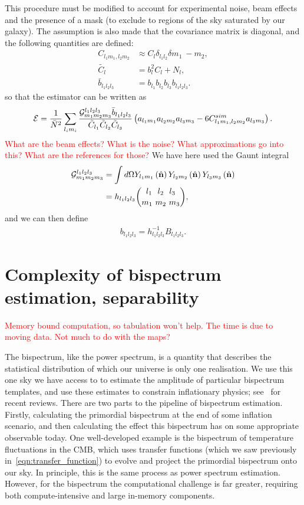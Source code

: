     This procedure must be modified to account for experimental noise, beam effects and
    the presence of a mask (to exclude to regions of the sky saturated by our galaxy).
    The assumption is also made that the covariance matrix is diagonal, and the
    following quantities are defined:
    \begin{align}
        C_{l_1m_1,l_2m_2}&\approx C_l\delta_{l_1l_2}\delta{m_1~-m_2},\\
           \tilde{C_l} &= b_l^2C_l+N_l,\\
           \bar{b}_{l_1l_2l_3} &= b_{l_1}b_{l_2}b_{l_3}b_{l_1l_2l_3}.
    \end{align}
    so that the estimator can be written as
    \begin{align}
        \mathcal{E} = \frac{1}{\bar{N}^2}\sum_{l_im_i}
        \frac{\mathcal{G}^{l_1l_2l_3}_{m_1m_2m_3}\bar{b}_{l_1l_2l_3}}{\tilde{C}_{l_1}\tilde{C}_{l_2}\tilde{C}_{l_3}}
        \left(a_{l_1m_1}a_{l_2m_2}a_{l_3m_3}-6C^{sim}_{l_1m_1,l_2m_2}a_{l_3m_3}\right).
    \end{align}
    \textcolor{red}{What are the beam effects? What is the noise? What approximations go into this?
    What are the references for those?}
    We have here used the Gaunt integral
    \begin{align}
        \mathcal{G}^{l_1l_2l_3}_{m_1m_2m_3} &= \int d\Omega Y_{l_1m_1}\left(\hat{\mathbf{n}}\right) Y_{l_2m_2}\left(\hat{\mathbf{n}}\right) Y_{l_3m_3}\left(\hat{\mathbf{n}}\right) \\
        &= h_{l_1l_2l_3}{{l_1~~l_2~~l_3} \choose {m_1~m_2~m_3}},
    \end{align}
    and we can then define
    \begin{align}
        b_{l_1l_2l_3} = h^{-1}_{l_1l_2l_3}B_{l_1l_2l_3}.
    \end{align}


    \section{Complexity of bispectrum estimation, separability}

\textcolor{red}{
Memory bound computation, so tabulation won't help. The time is due to moving data.
Not much to do with the maps?}


    The bispectrum, like the power spectrum, is a quantity that describes
the statistical distribution of which our universe is only one realisation.
We use this one sky we have access to to estimate the amplitude of
particular bispectrum templates,
and use these estimates to constrain inflationary physics; 
see~\cite{astro2020_features,astro2020_png} for recent reviews.
There are two parts to the pipeline of bispectrum estimation.
Firstly, calculating the primordial bispectrum at the end of some inflation scenario,
and then calculating the effect this bispectrum
has on some appropriate observable today.
One well-developed example is
the bispectrum of temperature fluctuations in the CMB, which uses transfer functions
(which we saw previously in~\eqref{eqn:transfer_function})
to evolve and project the primordial bispectrum onto our sky.
In principle, this is the same process as power spectrum estimation.
However, for the bispectrum the computational challenge is far greater,
requiring both compute-intensive and large in-memory components.


